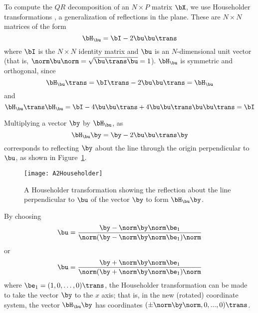 \label{pcb:qr}

To compute the $QR$ decomposition of an $N \times P$ matrix
$\bX$, we use Householder transformations \cite{hous:1958},
a generalization of reflections in the plane.
These are $N \times N$ matrices of the form
$$
\bH_{{\bu}} = \bI - 2 \bu \bu \trans
$$
where $\bI$ is the $N \times N$ identity matrix and $\bu$ is an
$N$-dimensional unit vector
(that is, $\norm \bu \norm  = \sqrt {\bu \trans \bu} = 1$).
$ \bH_{\bu}$ is symmetric and orthogonal, since
$$
\bH_{\bu} \trans =
\bI \trans -  2 \bu \bu \trans = \bH_{\bu}
$$
and
$$
\bH_{\bu} \trans \bH_{\bu} = \bI - 4 \bu \bu \trans +
4 \bu \bu \trans \bu \bu \trans = \bI
$$

Multiplying a vector $\by$ by $\bH_{\bu}$, as
$$
\bH_{\bu} \by =
\by - 2 \bu \bu \trans \by
$$
corresponds to reflecting $\by$ about the line through the origin
perpendicular to $\bu$, as shown in
Figure~\ref{fig:Householder}.
\begin{figure}
  \centerline{\texttt{[image: A2Householder]}}%
  \caption{\label{fig:Householder}
  A Householder transformation showing the reflection about the line
  perpendicular to $\bu$ of the vector $\by$ to form $\bH_{\bu} \by$.}
\end{figure}
By choosing
\begin{equation}
  \bu={\by-\norm\by\norm\be_1\over\norm(\by-\norm\by\norm\be_1)\norm}
  \label{eqn:1.16a}
\end{equation}
or
\begin{equation}
  \bu={\by+\norm\by\norm\be_1\over\norm(\by+\norm\by\norm\be_1)\norm}
  \label{eqn:1.16b}
\end{equation}
where $\be_1=(1,0,\ldots,0)\trans$,
the Householder transformation can be made to take the
vector $\by$ to the $x$ axis; that is, in the new (rotated) coordinate
system, the vector $\bH_{\bu} \by$ has coordinates
$( \pm \norm \by \norm , 0 ,..., 0 ) \trans$.
